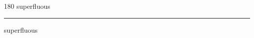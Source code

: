 
\begin{frame}
\begin{center}
\begin{turn}{180}
{\fontsize{2.5cm}{1em}\selectfont superfluous}
\end{turn}
\vspace{1em}\par  
\hrule
\vspace{1em}\par  
{\fontsize{2.5cm}{1em}\selectfont superfluous}
\end{center}
\end{frame}
